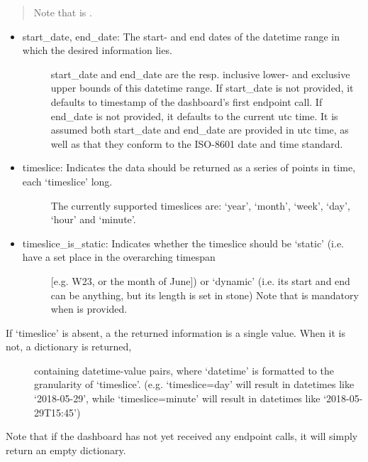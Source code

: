 \documentclass[letterpaper,10pt,english]{sphinxmanual}
\begin{document}
\begin{fulllineitems}
\begin{quote}
\begin{description}
\begin{itemize}
\end{itemize}

\end{description}

Note that  is .
\end{quote}
\begin{itemize}
\item {} \begin{description}
\item[{start\_date, end\_date: The start- and end dates of the datetime range in which the desired information lies.}] \leavevmode
start\_date and end\_date are the resp. inclusive lower- and exclusive upper bounds of this datetime range.
If start\_date is not provided, it defaults to timestamp of the dashboard’s first endpoint call.
If end\_date is not provided, it defaults to the current utc time.
It is assumed both start\_date and end\_date are provided in utc time, as well as that they conform to
the ISO-8601 date and time standard.

\end{description}

\item {} \begin{description}
\item[{timeslice: Indicates the data should be returned as a series of points in time, each ‘timeslice’ long.}] \leavevmode
The currently supported timeslices are: ‘year’, ‘month’, ‘week’, ‘day’, ‘hour’ and ‘minute’.

\end{description}

\item {} \begin{description}
\item[{timeslice\_is\_static: Indicates whether the timeslice should be ‘static’ (i.e. have a set place in the overarching timespan}] \leavevmode
{[}e.g. W23, or the month of June{]}) or ‘dynamic’ (i.e. its start and end can be anything, but its length is set in stone)
Note that  is mandatory when  is provided.

\end{description}

\end{itemize}
\begin{description}
\item[{If ‘timeslice’ is absent, a the returned information is a single value. When it is not, a dictionary is returned,}] \leavevmode
containing datetime-value pairs, where ‘datetime’ is formatted to the granularity of ‘timeslice’.
(e.g. ‘timeslice=day’ will result in datetimes like ‘2018-05-29’, while ‘timeslice=minute’ will result in
datetimes like ‘2018-05-29T15:45’)

\end{description}

Note that if the dashboard has not yet received any endpoint calls, it will simply return an empty dictionary.

\end{fulllineitems}
\end{document}
